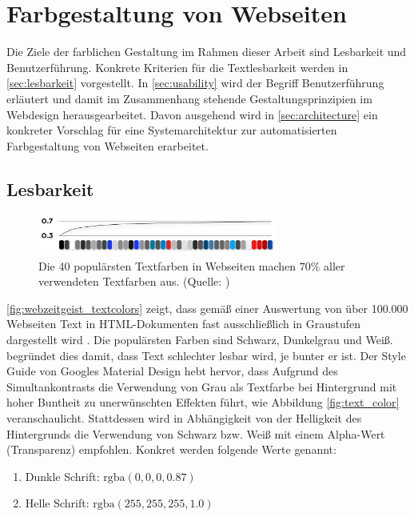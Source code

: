 \section{Farbgestaltung von Webseiten}
\label{sec:farbgestaltung}
Die Ziele der farblichen Gestaltung im Rahmen dieser Arbeit sind Lesbarkeit und Benutzerführung. Konkrete Kriterien für die Textlesbarkeit werden in \autoref{sec:lesbarkeit} vorgestellt. In  \autoref{sec:usability} wird der Begriff Benutzerführung erläutert und damit im Zusammenhang stehende Gestaltungsprinzipien im Webdesign herausgearbeitet. Davon ausgehend wird in \autoref{sec:architecture} ein konkreter Vorschlag für eine Systemarchitektur zur automatisierten Farbgestaltung von Webseiten erarbeitet.

\subsection{Lesbarkeit}
\label{sec:lesbarkeit}

\begin{figure}[]
	\centering
	\includegraphics[width=0.7\textwidth]{img/webzeitgeist_textcolors.png}
	\caption{Die 40 populärsten Textfarben in Webseiten machen $70\%$ aller verwendeten Textfarben aus. (Quelle: \citep{webzeitgeist})}
	\label{fig:webzeitgeist_textcolors}
\end{figure}

\autoref{fig:webzeitgeist_textcolors} zeigt, dass gemäß einer Auswertung von über 100.000 Webseiten Text in HTML-Dokumenten fast ausschließlich in Graustufen dargestellt wird \citep{webzeitgeist}. Die populärsten Farben sind Schwarz, Dunkelgrau und Weiß. \citet{webdesign} begründet dies damit, dass Text schlechter lesbar wird, je bunter er ist. Der Style Guide von Googles Material Design \citep{google} hebt hervor, dass Aufgrund des Simultankontrasts die Verwendung von Grau als Textfarbe bei Hintergrund mit hoher Buntheit zu unerwünschten Effekten führt, wie Abbildung \ref{fig:text_color} veranschaulicht. Stattdessen wird in Abhängigkeit von der Helligkeit des Hintergrunds die Verwendung von Schwarz bzw. Weiß mit einem Alpha-Wert (Transparenz) empfohlen. Konkret werden folgende Werte genannt:
\begin{enumerate}
	\item Dunkle Schrift: $\text{rgba}(0, 0, 0, 0.87)$
	\item Helle Schrift: $\text{rgba}(255, 255, 255, 1.0)$
\end{enumerate}

